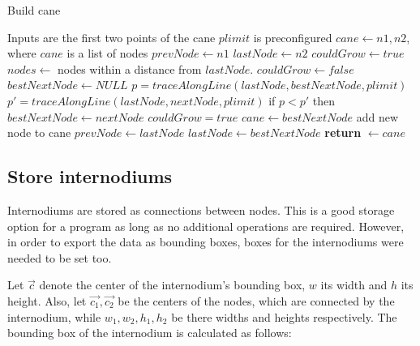 \documentclass{PSAIE}%
\begin{document}
\begin{algorithm}
      \caption{Build cane}
      \label{alg_build_cane}
      \begin{algorithmic}
             \Comment Inputs are the first two points of the cane
            \State $plimit$ is preconfigured
            \State $cane \gets n1, n2$, where $cane$ is a list of nodes
            \State $prevNode \gets n1$
            \State $lastNode \gets n2$
            \State $couldGrow \gets true$
            \State $nodes \gets$ nodes within a distance from $lastNode$.
            \State $couldGrow \gets false$
            \State $bestNextNode \gets NULL$
            \State $p = traceAlongLine(lastNode, bestNextNode, plimit)$
            \State $p' = traceAlongLine(lastNode, nextNode, plimit)$
            \State if $p < p'$ then $bestNextNode \gets nextNode$
            \EndIf
            \EndFor
            \State $couldGrow = true$
            \State $cane \gets bestNextNode$ \Comment add new node to cane
            \State $prevNode \gets lastNode$
            \State $lastNode \gets bestNextNode$
            \EndIf
            \EndWhile
            \State \textbf{return} $\gets cane$
            \EndFunction
      \end{algorithmic}
\end{algorithm}

\subsection{Store internodiums} \label{sec_store_internodiums}
Internodiums are stored as connections between nodes. This is a good storage option for a program as long as
no additional operations are required. However, in order to export the data as bounding boxes, boxes for the
internodiums were needed to be set too.

Let $\vec{c}$ denote the center of the internodium's bounding box, $w$ its width and $h$ its height.
Also, let $\vec{c_1}, \vec{c_2}$ be the centers of the nodes, which are connected by the internodium, while
$w_1, w_2, h_1, h_2$ be there widths and heights respectively. The bounding box of the internodium is calculated
as follows:
\end{document}
